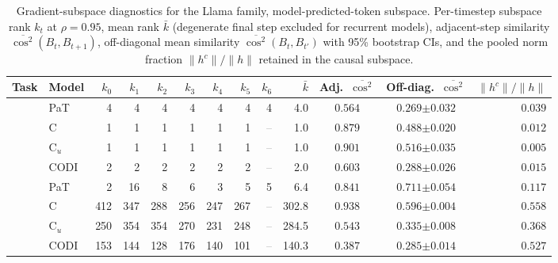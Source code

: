 \begin{table}[h!]
\centering
\small
\setlength{\tabcolsep}{2.5pt}
\caption{Gradient-subspace diagnostics for the Llama family, model-predicted-token subspace. Per-timestep subspace rank $k_t$ at $\rho{=}0.95$, mean rank $\bar k$ (degenerate final step excluded for recurrent models), adjacent-step similarity $\overline{\cos^2}(B_t, B_{t+1})$, off-diagonal mean similarity $\overline{\cos^2}(B_t, B_{t'})$ with 95\% bootstrap CIs, and the pooled norm fraction $\|h^c\|/\|h\|$ retained in the causal subspace.}
\label{tab:subspace_geometry_llama_pred}
\begin{tabular}{llrrrrrrrrccr}
\toprule
Task & Model & $k_{0}$ & $k_{1}$ & $k_{2}$ & $k_{3}$ & $k_{4}$ & $k_{5}$ & $k_{6}$ & $\bar k$ & Adj.\ $\overline{\cos^2}$ & Off-diag.\ $\overline{\cos^2}$ & $\|h^c\|/\|h\|$ \\
\midrule
{} & PaT & 4 & 4 & 4 & 4 & 4 & 4 & 4 & 4.0 & $0.564$ & $0.269 {\scriptstyle \pm 0.032}$ & $0.039$ \\
 & C & 1 & 1 & 1 & 1 & 1 & 1 & \textcolor{gray}{--} & 1.0 & $0.879$ & $0.488 {\scriptstyle \pm 0.020}$ & $0.012$ \\
 & C$_u$ & 1 & 1 & 1 & 1 & 1 & 1 & \textcolor{gray}{--} & 1.0 & $0.901$ & $0.516 {\scriptstyle \pm 0.035}$ & $0.005$ \\
 & CODI & 2 & 2 & 2 & 2 & 2 & 2 & \textcolor{gray}{--} & 2.0 & $0.603$ & $0.288 {\scriptstyle \pm 0.026}$ & $0.015$ \\
\midrule
{} & PaT & 2 & 16 & 8 & 6 & 3 & 5 & 5 & 6.4 & $0.841$ & $0.711 {\scriptstyle \pm 0.054}$ & $0.117$ \\
 & C & 412 & 347 & 288 & 256 & 247 & 267 & \textcolor{gray}{--} & 302.8 & $0.938$ & $0.596 {\scriptstyle \pm 0.004}$ & $0.558$ \\
 & C$_u$ & 250 & 354 & 354 & 270 & 231 & 248 & \textcolor{gray}{--} & 284.5 & $0.543$ & $0.335 {\scriptstyle \pm 0.008}$ & $0.368$ \\
 & CODI & 153 & 144 & 128 & 176 & 140 & 101 & \textcolor{gray}{--} & 140.3 & $0.387$ & $0.285 {\scriptstyle \pm 0.014}$ & $0.527$ \\
\bottomrule
\end{tabular}
\end{table}